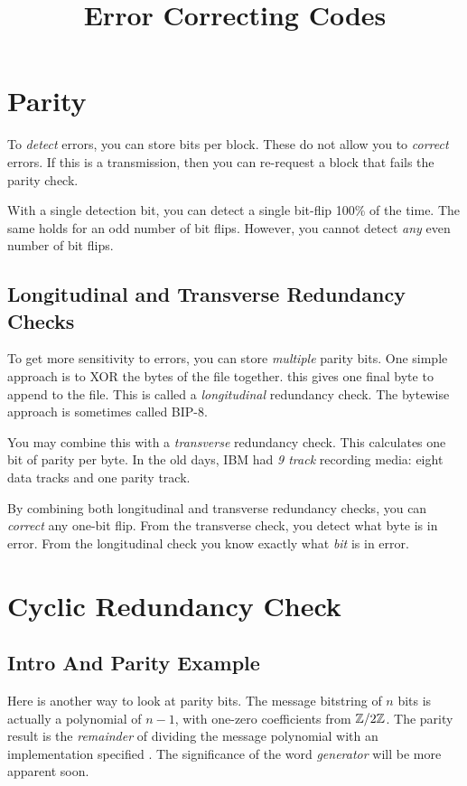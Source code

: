 \documentclass[11pt, oneside]{amsart}
\begin{document}
\title{Error Correcting Codes}
\maketitle

\section{Parity}

To \emph{detect} errors, you can store  bits per block.
These do not allow you to \emph{correct} errors. If this is a
transmission, then you can re-request a block that fails the parity check.

With a single detection bit, you can detect a single bit-flip 100\% of
the time. The same holds for an odd number of bit flips. However, you
cannot detect \emph{any} even number of bit flips.

\subsection{Longitudinal and Transverse Redundancy Checks}

To get more sensitivity to errors, you can store \emph{multiple} parity
bits. One simple approach is to XOR the bytes of the file together. this
gives one final byte to append to the file. This is called a
\emph{longitudinal} redundancy check. The bytewise approach is sometimes
called BIP-8.

You may combine this with a \emph{transverse} redundancy check. This
calculates one bit of parity per byte. In the old days, IBM had \emph{9
track} recording media: eight data tracks and one parity track.

By combining both longitudinal and transverse redundancy checks, you can
\emph{correct} any one-bit flip. From the transverse check, you detect
what byte is in error. From the longitudinal check you know exactly what
\emph{bit} is in error.

\section{Cyclic Redundancy Check}

\subsection{Intro And Parity Example}

Here is another way to look at parity bits. The message bitstring of $n$
bits is actually a polynomial of $n-1$, with one-zero coefficients from
$\mathbb{Z} / 2\mathbb{Z}$. The parity result is the \emph{remainder} of dividing the
message polynomial with an implementation specified . The significance of the word \emph{generator} will be more
apparent soon.
\end{document}
